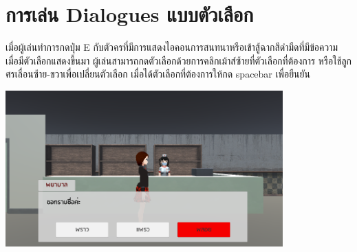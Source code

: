 \section*{การเล่น Dialogues แบบตัวเลือก}
เมื่อผู้เล่นทำการกดปุ่ม E กับตัวครที่มีการแสดงไอคอนการสนทนาหรือเข้าสู้ฉากสีดำมืดที่มีข้อความ เมื่อมีตัวเลือกแสดงขึ้นมา ผู้เล่นสามารถกดตัวเลือกด้วยการคลิกเม้าส์ซ้ายที่ตัวเลือกที่ต้องการ หรือใช้ลูกศรเลื่อนซ้าย-ขวาเพื่อเปลี่ยนตัวเลือก เมื่อได้ตัวเลือกที่ต้องการให้กด spacebar เพื่อยืนยัน
\begin{center}
    \includegraphics[width=0.8\textwidth, height=0.25\textheight]{Images/Dialogue with choice.png}
\end{center}